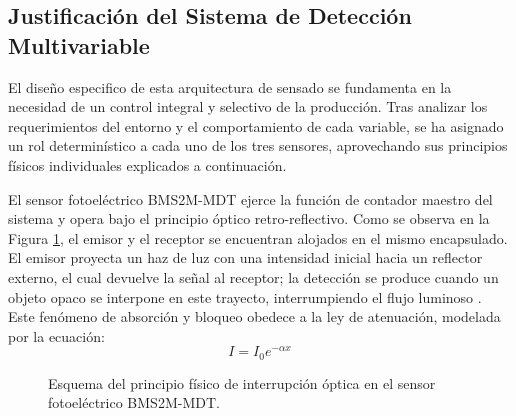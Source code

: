 \documentclass[conference]{IEEEtran}
\begin{document}
\subsection{Justificación del Sistema de Detección Multivariable}

El diseño especifico de esta arquitectura de sensado se fundamenta en la necesidad de un control integral y selectivo de la producción. Tras analizar los requerimientos del entorno y el comportamiento de cada variable, se ha asignado un rol determinístico a cada uno de los tres sensores, aprovechando sus principios físicos individuales explicados a continuación.

El sensor fotoeléctrico  BMS2M-MDT ejerce la función de contador maestro del sistema y opera bajo el principio óptico retro-reflectivo. Como se observa en la Figura \ref{fig:principio_foto}, el emisor y el receptor se encuentran alojados en el mismo encapsulado. El emisor proyecta un haz de luz con una intensidad inicial hacia un reflector externo, el cual devuelve la señal al receptor; la detección se produce cuando un objeto opaco se interpone en este trayecto, interrumpiendo el flujo luminoso \cite{sensores_11, sensores_9}. Este fenómeno de absorción y bloqueo obedece a la ley de atenuación, modelada por la ecuación:
\begin{equation}
    I = I_0 e^{-\alpha x}
\end{equation}

\begin{figure}[htbp]
    \centering
    \caption{Esquema del principio físico de interrupción óptica en el sensor fotoeléctrico BMS2M-MDT.}
    \label{fig:principio_foto}
\end{figure}
\end{document}
